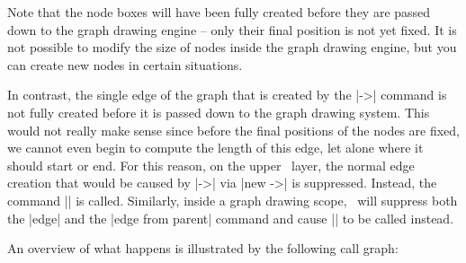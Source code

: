 Note that the node boxes will have been fully created before they are
passed down to the graph drawing engine -- only their final position
is not yet fixed. It is not possible to modify the size of nodes
inside the graph drawing engine, but you can create new nodes in
certain situations.

In contrast, the single edge of the graph that is created by the |->|
command is not fully created before it is passed down to the
graph drawing system. This would not really make sense since before the final
positions of the nodes are fixed, we cannot even begin to compute the
length of this edge, let alone where it should start or end. For this
reason, on the upper \tikzname\ layer, the normal edge creation that
would be caused by |->| via |new ->| is suppressed. Instead, the
command |\pgfgdedge| is called. Similarly, inside a graph drawing
scope, \tikzname\ will suppress both the |edge| and the
|edge from parent| command and cause |\pgfgdedge| to be called
instead. 

An overview of what happens is illustrated by the following call graph:

\bigskip

